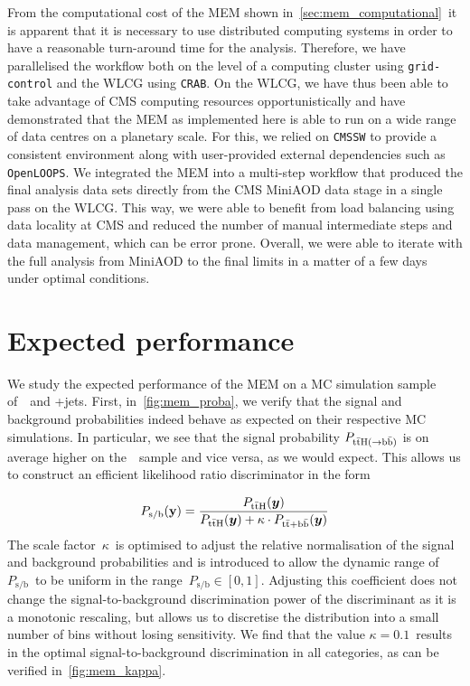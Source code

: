 From the computational cost of the MEM shown in~\cref{sec:mem_computational}~it is apparent that it is necessary to use distributed computing systems in order to have a reasonable turn-around time for the analysis. Therefore, we have parallelised the workflow both on the level of a computing cluster using \texttt{grid-control} and the WLCG using \texttt{CRAB}. On the WLCG, we have thus been able to take advantage of CMS computing resources opportunistically and have demonstrated that the MEM as implemented here is able to run on a wide range of data centres on a planetary scale. For this, we relied on \texttt{CMSSW} to provide a consistent environment along with user-provided external dependencies such as \texttt{OpenLOOPS}. We integrated the MEM into a multi-step workflow that produced the final analysis data sets directly from the CMS MiniAOD data stage in a single pass on the WLCG. This way, we were able to benefit from load balancing using data locality at CMS and reduced the number of manual intermediate steps and data management, which can be error prone. Overall, we were able to iterate with the full analysis from MiniAOD to the final limits in a matter of a few days under optimal conditions.

\section{Expected performance}
\label{sec:mem_performace}
We study the expected performance of the MEM on a MC simulation sample of~\ttHbb~and \ttbar+jets. First, in~\cref{fig:mem_proba}, we verify that the signal and background probabilities indeed behave as expected on their respective MC simulations. In particular, we see that the signal probability $P_{\mathrm{t} \bar{\mathrm{t}} \mathrm{H} (\rightarrow \mathrm{b}\bar{\mathrm{b}})}$ is on average higher on the~\ttHbb~sample and vice versa, as we would expect. This allows us to construct an efficient likelihood ratio discriminator in the form

\begin{equation}
P_{\mathrm{s}/\mathrm{b}}(\mathbf{y}) = \frac{P_{\mathrm{\mathrm{t} \bar{\mathrm{t}} \mathrm{H}}}(\boldsymbol{y})}{P_{\mathrm{\mathrm{t} \bar{\mathrm{t}} \mathrm{H}}}(\boldsymbol{y}) + \kappa \cdot P_{\mathrm{\mathrm{t} \bar{\mathrm{t}} + \mathrm{b}\bar{\mathrm{b}}}}(\boldsymbol{y})}
\end{equation}
The scale factor~$\kappa$~is optimised to adjust the relative normalisation of the signal and background probabilities and is introduced to allow the dynamic range of~$P_{\mathrm{s}/\mathrm{b}}$~to be uniform in the range~$P_{\mathrm{s}/\mathrm{b}} \in [0, 1]$. Adjusting this coefficient does not change the signal-to-background discrimination power of the discriminant as it is a monotonic rescaling, but allows us to discretise the distribution into a small number of bins without losing sensitivity. We find that the value $\kappa = 0.1$~results in the optimal signal-to-background discrimination in all categories, as can be verified in~\cref{fig:mem_kappa}.

